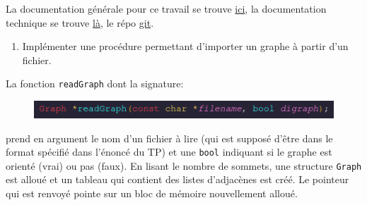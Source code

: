 \documentclass[10pt]{article} %
\begin{document}
\vspace{1cm}

La documentation générale pour ce travail se trouve \href{https://polytech-sorbonne-main-tp2.readthedocs.io/en/latest/}{ici}, la documentation
technique se trouve \href{https://ejovo13.github.io/DSA_TP1/}{là}, le répo \href{https://github.com/ejovo13/DSA_TP1}{git}.

\vspace{1cm}
\noindent {} 

\begin{enumerate}
    \item Implémenter une procédure permettant d'importer un graphe à partir d'un fichier.
\end{enumerate}



La fonction \texttt{readGraph} dont la signature:
\begin{figure}[h!]
    \centering
    \includegraphics[height=.5cm]{media/readGraph.png}
\end{figure}

prend en argument le nom d'un fichier à lire (qui est supposé d'être dans le format spécifié dans l'énoncé du TP) et une
\texttt{bool} indiquant si le graphe est orienté (vrai) ou pas (faux). En lisant le nombre de sommets, une structure \texttt{Graph} est alloué
et un tableau qui contient des listes d'adjacènes est créé. Le pointeur qui est renvoyé pointe sur un bloc de mémoire nouvellement alloué.
\end{document}

